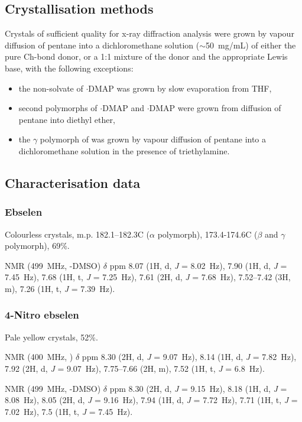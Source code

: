 \begin{refsection}
\subsection{Crystallisation methods}
Crystals of sufficient quality for x-ray diffraction analysis were grown by vapour diffusion of pentane into a dichloromethane solution ($\sim$50~mg/mL) of either the pure Ch-bond donor, or a 1:1 mixture of the donor and the appropriate Lewis base, with the following exceptions:
\begin{itemize}
    \item the non-solvate of $\cdot$DMAP was grown by slow evaporation from THF,
    \item second polymorphs of $\cdot$DMAP and $\cdot$DMAP were grown from diffusion of pentane into diethyl ether,
    \item the $\gamma$ polymorph of  was grown by vapour diffusion of pentane into a dichloromethane solution in the presence of triethylamine.
\end{itemize}

\subsection{Characterisation data}

\subsubsection{Ebselen }
Colourless crystals, m.p. 182.1--182.3\degree C ($\alpha$ polymorph), 173.4-174.6\degree C ($\beta$ and $\gamma$ polymorph), 69\%.

 NMR (499~MHz, -DMSO) $\delta$ ppm 8.07 (1H, d, \emph{J} = 8.02~Hz), 7.90 (1H, d, \emph{J} = 7.45~Hz), 7.68 (1H, t, \emph{J} = 7.25~Hz), 7.61 (2H, d, \emph{J} = 7.68~Hz), 7.52--7.42 (3H, m), 7.26 (1H, t, \emph{J} = 7.39~Hz).

\subsubsection{4-Nitro ebselen }
Pale yellow crystals, 52\%.

 NMR (400~MHz, ) $\delta$ ppm 8.30 (2H, d, \emph{J} = 9.07~Hz), 8.14 (1H, d, \emph{J} = 7.82~Hz), 7.92 (2H, d, \emph{J} = 9.07~Hz), 7.75--7.66 (2H, m), 7.52 (1H, t, \emph{J} = 6.8~Hz).

 NMR (499~MHz, -DMSO) $\delta$ ppm 8.30 (2H, d, \emph{J} = 9.15~Hz), 8.18 (1H, d, \emph{J} = 8.08~Hz), 8.05 (2H, d, \emph{J} = 9.16~Hz), 7.94 (1H, d, \emph{J} = 7.72~Hz), 7.71 (1H, t, \emph{J} = 7.02~Hz), 7.5 (1H, t, \emph{J} = 7.45~Hz).


\end{refsection}
